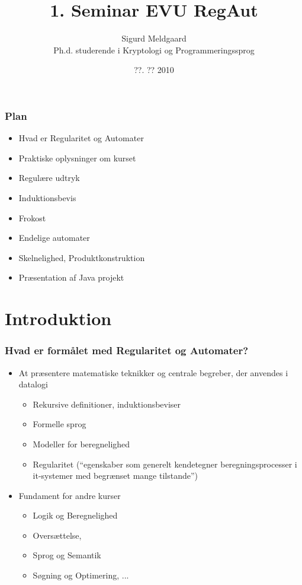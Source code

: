 \documentclass[]{beamer}
\title{1. Seminar EVU RegAut}
\author[S. Meldgaard]{Sigurd Meldgaard\\
Ph.d. studerende i Kryptologi og Programmeringssprog}
\date{??. ?? 2010}
\institute[AU]{Datalogisk Institut\\
  Århus Universitet\\
  \texttt{stm@cs.au.dk}
}
\begin{document}
\maketitle
\begin{frame}
\frametitle{Plan}

\begin{itemize}[<alert@+>]
\item Hvad er Regularitet og Automater
\item Praktiske oplysninger om kurset
\item Regulære udtryk
\item Induktionsbevis
\item Frokost
\item Endelige automater
\item Skelnelighed, Produktkonstruktion
\item Præsentation af Java projekt
  \end{itemize}
\end{frame}

\section{Introduktion}

\begin{frame}
  \frametitle{Hvad er formålet med Regularitet og Automater?}
  \begin{itemize}[<+->]
  \item At præsentere matematiske teknikker og centrale begreber, der anvendes i datalogi
    \begin{itemize}
    \item Rekursive definitioner, induktionsbeviser
    \item Formelle sprog
    \item Modeller for beregnelighed
    \item Regularitet (``egenskaber som generelt kendetegner beregningsprocesser i it-systemer med begrænset mange tilstande'')    
    \end{itemize}
  \item Fundament for andre kurser
    \begin{itemize}
    \item Logik og Beregnelighed
    \item Oversættelse, 
    \item Sprog og Semantik
    \item Søgning og Optimering, ...
    \end{itemize}
  \end{itemize}
\end{frame}
\end{document}
